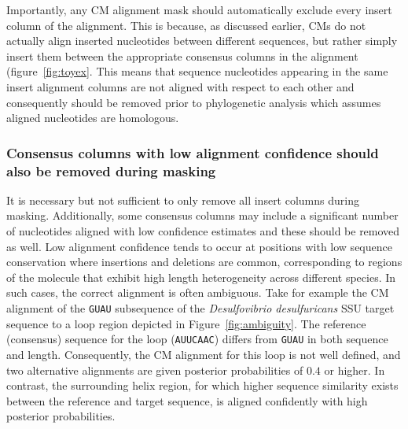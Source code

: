 Importantly, any CM alignment mask should automatically exclude 
every insert column of the alignment. This is because, as discussed
earlier, CMs do not actually align inserted nucleotides between
different sequences, but rather simply insert them between the
appropriate consensus columns in the alignment
(figure~\ref{fig:toyex}. This means that sequence nucleotides
appearing in the same insert alignment columns are not aligned with
respect to each other and consequently should be removed prior to
phylogenetic analysis which assumes aligned nucleotides are
homologous. 

\subsubsection{Consensus columns with low alignment confidence should
  also be removed during masking}

It is necessary but not sufficient to only remove all insert columns
during masking. Additionally, some consensus columns may include
a significant number of nucleotides aligned with low confidence
estimates and these should be removed as well. 
Low alignment confidence tends to occur at positions with low sequence
conservation where insertions and deletions are common, 
corresponding to regions of the molecule that exhibit high length
heterogeneity across different species. 
In such cases, the correct alignment is often ambiguous.
Take for example the CM alignment
of the {\tt GUAU} subsequence of the \emph{Desulfovibrio
desulfuricans} SSU target sequence to a loop region depicted in
Figure~\ref{fig:ambiguity}. The reference (consensus) sequence for the
loop ({\tt AUUCAAC}) differs from {\tt GUAU} in both sequence and
length. Consequently, the CM alignment for this loop is not well
defined, and two alternative alignments are given posterior
probabilities of $0.4$ or higher.  In contrast, the surrounding helix
region, for which higher sequence similarity exists between the
reference and target sequence, is aligned confidently with high
posterior probabilities.


